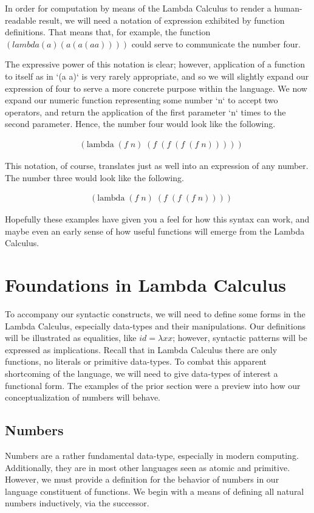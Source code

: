 In order for computation by means of the Lambda Calculus to render a 
human-readable result, we will need a notation of expression exhibited by function
definitions. That means that, for example, the function 
$(lambda (a) (a (a (a a))))$ could serve to communicate the number four.

The expressive power of this notation is clear; however, application of a function 
to itself as in `(a a)` is very rarely appropriate, and so we will slightly expand 
our expression of four to serve a more concrete purpose within the language. We
now expand our numeric function representing some number `n` to accept two
operators, and return the application of the first parameter `n` times to the
second parameter. Hence, the number four would look like the following.

\begin{align*}
& (\text{lambda} \; (f \; n) \; (f \; (f \; (f \; (f \; n)))))
\end{align*}

This notation, of course, translates just as well into an expression of any
number. The number three would look like the following.

\begin{align*}
& (\text{lambda} \; (f \; n) \; (f \; (f \; (f \; n))))
\end{align*}

Hopefully these examples have given you a feel for how this syntax can work, and
maybe even an early sense of how useful functions will emerge from the Lambda
Calculus.

\section{Foundations in Lambda Calculus}
To accompany our syntactic constructs, we will need to define some forms in the
Lambda Calculus, especially data-types and their manipulations. Our definitions
will be illustrated as equalities, like $id = \lambda xx$; however, syntactic
patterns will be expressed as implications. Recall that in Lambda Calculus there
are only functions, no literals or primitive data-types. To combat this apparent
shortcoming of the language, we will need to give data-types of interest a
functional form. The examples of the prior section were a preview into how our
conceptualization of numbers will behave.

\subsection{Numbers}
Numbers are a rather fundamental data-type, especially in modern computing.
Additionally, they are in most other languages seen as atomic and primitive.
However, we must provide a definition for the behavior of numbers in our language 
constituent of functions. We begin with a means of defining all natural numbers
inductively, via the successor.

